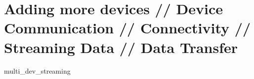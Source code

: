 \chapter{Adding more devices // Device Communication // Connectivity // Streaming Data // Data Transfer}
{multi_dev_streaming}